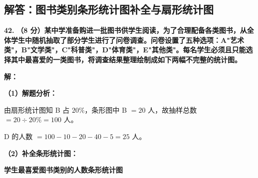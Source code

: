 \newpage

\newpage

\subsection{解答：图书类别条形统计图补全与扇形统计图}

\vspace{0.6cm}

\textbf{\LARGE 42.} \textbf{（8 分）某中学准备购进一批图书供学生阅读，为了合理配备各类图书，从全体学生中随机抽取了部分学生进行了问卷调查。问卷设置了五种选项：A"艺术类"，B"文学类"，C"科普类"，D"体育类"，E"其他类"。每名学生必须且只能选择其中最喜爱的一类图书，将调查结果整理绘制成如下两幅不完整的统计图。}

\vspace{0.4cm}
\textbf{解：}

\textbf{（1）解题分析：}

由扇形统计图知 B 占 $20\%$，条形图中 B $= 20$ 人，故抽样总数 $= 20 \div 20\% = 100$ 人。

D 的人数 $= 100 - 10 - 20 - 40 - 5 = 25$ 人。

\vspace{0.2cm}
\textbf{（2）补全条形统计图：}

\begin{center}
{\textbf{学生最喜爱图书类别的人数条形统计图}}
\end{center}

